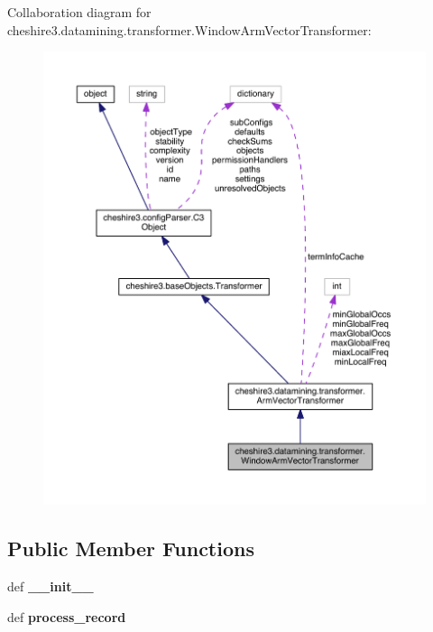 Collaboration diagram for cheshire3.\-datamining.\-transformer.\-Window\-Arm\-Vector\-Transformer\-:
\nopagebreak
\begin{figure}[H]
\begin{center}
\leavevmode
\includegraphics[width=350pt]{classcheshire3_1_1datamining_1_1transformer_1_1_window_arm_vector_transformer__coll__graph}
\end{center}
\end{figure}
\subsection*{Public Member Functions}
\begin{DoxyCompactItemize}
\item 
\hypertarget{classcheshire3_1_1datamining_1_1transformer_1_1_window_arm_vector_transformer_ad27c110ef67f80ee5036de050a3ee9f5}{def {\bfseries \-\_\-\-\_\-init\-\_\-\-\_\-}}\label{classcheshire3_1_1datamining_1_1transformer_1_1_window_arm_vector_transformer_ad27c110ef67f80ee5036de050a3ee9f5}

\item 
\hypertarget{classcheshire3_1_1datamining_1_1transformer_1_1_window_arm_vector_transformer_abcada152a59361dc945fdffd33b6d8cd}{def {\bfseries process\-\_\-record}}\label{classcheshire3_1_1datamining_1_1transformer_1_1_window_arm_vector_transformer_abcada152a59361dc945fdffd33b6d8cd}

\end{DoxyCompactItemize}
